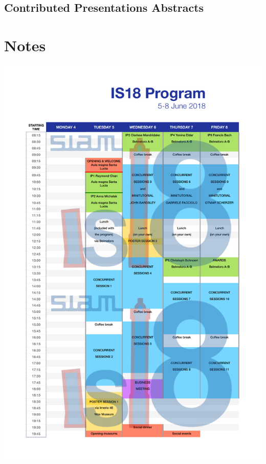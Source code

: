 \documentclass[twoside]{book}
\begin{document}
\chapter*{Contributed Presentations Abstracts}


%

\newpage
\part{Notes}
\thispagestyle{empty}
\includegraphics[scale=0.6]{program_table.pdf}
\end{document}
